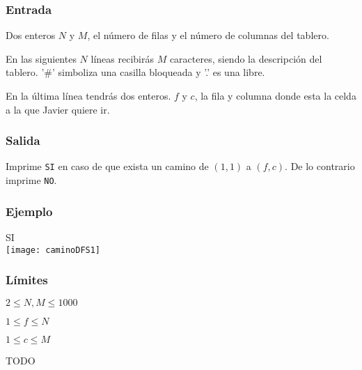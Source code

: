 \subsubsection*{Entrada}
Dos enteros \(N\) y \(M\), el número de filas y el número de columnas del tablero.

En las siguientes \(N\) líneas recibirás \(M\) caracteres, siendo la descripción del tablero. '\#' simboliza una casilla bloqueada y '.' es una libre.

En la última línea tendrás dos enteros. \(f\) y \(c\), la fila y columna donde esta la celda a la que Javier quiere ir.

\subsubsection*{Salida}
Imprime \verb|SI| en caso de que exista un camino de \((1, 1)\) a \((f, c)\). De lo contrario imprime \verb|NO|.

\subsubsection*{Ejemplo}

\begin{casebox3}
	 {
	SI
	}{
	\\
	\texttt{[image: caminoDFS1]}
	}
\end{casebox3}

\subsubsection*{Límites}
\begin{plimits}
	\item \(2\leq N, M\leq 1000\)
	\item \(1\leq f \leq N\)
	\item \(1\leq c \leq M\)
\end{plimits}

\omegalink{} TODO
